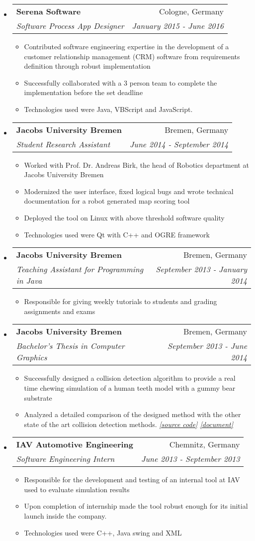 \documentclass[letterpaper,11pt]{article}
\makeatletter
\newcommand{\resitem}[1]{\item #1 \vspace{-2pt}}
\newcommand{\ressubheading}[4]{
	\begin{tabular*}{6.5in}{l@{\cftdotfill{\cftsecdotsep}\extracolsep{\fill}}r}
		\textbf{#1} & #2 \\
		\textit{#3} & \textit{#4} \\
	\end{tabular*}\vspace{-6pt}}
\makeatother
\begin{document}
\begin{itemize}
		\item
		\ressubheading{Serena Software}{Cologne, Germany}{Software Process App Designer}{ January 2015 - June 2016}
		\begin{itemize}
			\resitem{Contributed software engineering expertise in the development of a customer relationship management
				(CRM) software from requirements definition through robust implementation}
			\resitem{Successfully collaborated with a 3 person team to complete the implementation before the set deadline}
			\resitem{Technologies used were Java, VBScript and JavaScript.}
		\end{itemize}
		
		\item
		\ressubheading{Jacobs University Bremen}{Bremen, Germany}{Student Research Assistant}{ June 2014 - September 2014}
		\begin{itemize}
			\resitem{Worked with Prof. Dr. Andreas Birk, the head of Robotics department at Jacobs University Bremen}
			\resitem{Modernized the user interface, fixed logical bugs and wrote technical documentation for a robot
				generated map scoring tool}
			\resitem{Deployed the tool on Linux with above threshold software quality}
			\resitem{Technologies used were Qt with C++ and OGRE framework}
		\end{itemize}
		
		\item
		\ressubheading{Jacobs University Bremen}{Bremen, Germany}{Teaching Assistant for Programming in Java}{September 2013 - January 2014}
		\begin{itemize}
			\resitem{Responsible for giving weekly tutorials to students and grading assignments and exams}
		\end{itemize}
		
		\item
		\ressubheading{Jacobs University Bremen}{Bremen, Germany}{Bachelor’s Thesis in Computer Graphics}{September 2013 - June 2014}
		\begin{itemize}
			\resitem{Successfully designed a collision detection algorithm to provide a real time chewing simulation of a
				human teeth model with a gummy bear substrate}
			\resitem{Analyzed a detailed comparison of the designed method with the other state of the art collision
				detection methods. \textcolor{gray}{\textit{\href{https://github.com/musaeed/Distance-field/tree/master/src}{[source code]} \href{https://github.com/musaeed/Resume/blob/main/Bachelors-thesis.pdf}{[document]}}}}
		\end{itemize}
		
		\item
		\ressubheading{IAV Automotive Engineering}{Chemnitz, Germany}{Software Engineering Intern}{June 2013 - September 2013}
		\begin{itemize}
			\resitem{Responsible for the development and testing of an internal tool at IAV used to evaluate simulation
				results}
			\resitem{Upon completion of internship made the tool robust enough for its initial launch inside the company.}
			\resitem{Technologies used were C++, Java swing and XML}
		\end{itemize}
		
	\end{itemize}
	
\end{document}
